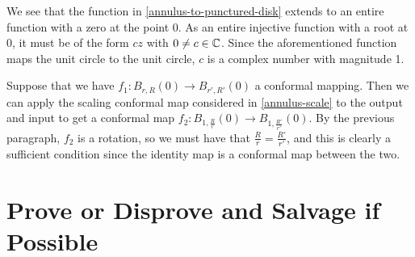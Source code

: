 \documentclass{homework}
\begin{document}
                                                                                                                                                                                        \begin{solution}
                                                                                                                                                                                        We see that the function in \ref{annulus-to-punctured-disk} extends to an entire function with a zero at the point 0. As an entire injective function with a root at 0, it must be of the form $cz$ with $0\neq c \in\mathbb{C}$. Since the aforementioned function maps the unit circle to the unit circle, $c$ is a complex number with magnitude 1.

                                                                                                                                                                                        Suppose that we have $f_1:B_{r,R}(0) \to B_{r',R'}(0)$ a conformal mapping. Then we can apply the scaling conformal map considered in \ref{annulus-scale} to the output and input to get a conformal map $f_2:B_{1,\frac{R}{r}}(0) \to B_{1,\frac{R'}{r'}}(0)$. By the previous paragraph, $f_2$ is a rotation, so we must have that $\frac{R}{r} = \frac{R'}{r'}$, and this is clearly a sufficient condition since the identity map is a conformal map between the two.
                                                                                                                                                                                        \end{solution}
                                                                                                                                                                                        \section{Prove or Disprove and Salvage if Possible}
\end{document}

